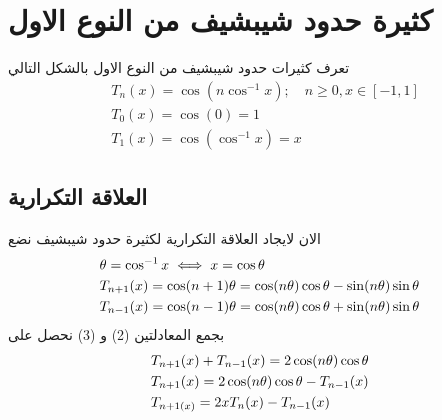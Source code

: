 \section{كثيرة حدود شيبشيف من النوع الاول}
تعرف كثيرات حدود شيبشيف من النوع الاول بالشكل التالي
\begin{align}
		&T_n(x) = \cos(n\cos^{-1}x);\quad n\geq 0 , x\in [-1,1]\\
		&T_0(x) = \cos(0) = 1\tag{كثيرة حدود شيبشيف من الدرجة 0}\\
		&T_1(x) = \cos(\cos^{-1}x) = x \tag{كثيرة حدود شيبشيف من الدرجة 1}
\end{align}

\subsection*{العلاقة التكرارية}
الان لايجاد العلاقة التكرارية لكثيرة حدود شيبشيف نضع
\begin{align}
	& \theta = \cos^{-1}x \iff x = \cos\theta\notag\\
	&T_{n+1}(x) = \cos(n+1)\theta= \cos(n\theta)\cos\theta - \sin(n\theta)\sin\theta\\
	&T_{n-1}(x) =\cos(n-1)\theta=\cos(n\theta)\cos\theta+\sin(n\theta)\sin\theta		
\end{align}
بجمع المعادلتين (2) و (3) نحصل على
\begin{align}
	&T_{n+1}(x) + T_{n-1}(x) = 2\cos(n\theta)\cos\theta\notag\\
	&T_{n+1}(x) = 2\cos(n\theta)\cos\theta - T_{n-1}(x)\notag\\
	&T_{n+1(x)} = 2xT_n(x) - T_{n-1}(x) 
\end{align}

